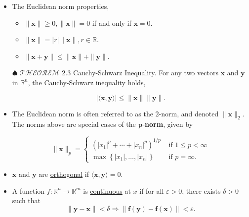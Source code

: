 \documentclass[12pt,thmsa]{article}
\begin{document}
\begin{itemize}
	\item The Euclidean norm properties,
	\begin{itemize}
		\item \(\|\boldsymbol{x}\| \geq 0,\|\boldsymbol{x}\|=0\) if and only if \(\boldsymbol{x}=0\).
		
		\item \(\|\boldsymbol{x}\|=|r|\|\boldsymbol{x}\|, r \in \mathbb{R}\).
		
		\item \(\|\boldsymbol{x}+\boldsymbol{y}\| \leq\|\boldsymbol{x}\|+\|\boldsymbol{y}\|\).
	\end{itemize}
	\item[\(\spadesuit\)] \(\mathscr{THEOREM}\) 2.3 Cauchy-Schwarz Inequality. For any two vectors \(\boldsymbol{x}\) and \(\boldsymbol{y}\) in \(\mathbb{R}^{n}\), the Cauchy-Schwarz inequality holds,
	
	\begin{equation*}
		|\langle\boldsymbol{x}, \boldsymbol{y}\rangle| \leq\|\boldsymbol{x}\|\|\boldsymbol{y}\|.
	\end{equation*}	
	
\end{itemize}

\begin{itemize}
	
	\item The Euclidean norm is often referred to as the 2-norm, and denoted \(\|\boldsymbol{x}\|_{2} \). The norms above are special cases of the \(\boldsymbol{p}\)-\textbf{norm}, given by
	
	\[
	\|\boldsymbol{x}\|_{p}=\left\{\begin{array}{ll}
		\left(\left|x_{1}\right|^{p}+\cdots+\left|x_{n}\right|^{p}\right)^{1 / p} & \text { if } 1 \leq p<\infty \\
		\max \left\{\left|x_{1}\right|, \ldots,\left|x_{n}\right|\right\} & \text { if } p=\infty.
	\end{array}\right.
	\]
\end{itemize}
	
\begin{itemize}
	\item \(\boldsymbol{x}\) and \(\boldsymbol{y}\) are \underline{orthogonal} if \(\langle\boldsymbol{x}, \boldsymbol{y}\rangle=0\).
	
	\item A function \(f: \mathbb{R}^{n} \rightarrow \mathbb{R}^{m}\) is \underline{continuous} at \(x\) if for all \(\varepsilon>0\), there exists \(\delta>0\) such that \[\|\boldsymbol{y}-\boldsymbol{x}\|<\delta \Rightarrow\|\boldsymbol{f}(\boldsymbol{y})-\boldsymbol{f}(\boldsymbol{x})\|<\varepsilon.\]
	
\end{itemize}
\end{document}
